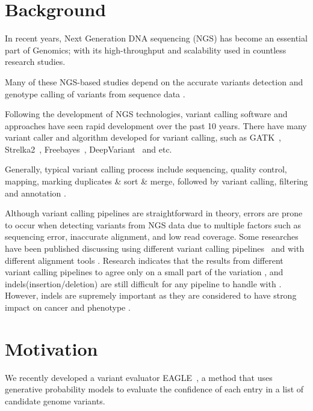 \hspace{24pt}

\section{Background}
In recent years, Next Generation DNA sequencing (NGS) has become an essential part of Genomics; with its high-throughput and scalability used in countless research studies.

Many of these NGS-based studies depend on the accurate variants detection and genotype calling of variants from sequence data \cite{nielsen2011genotype}.

Following the development of NGS technologies, variant calling software and approaches have seen rapid development over the past 10 years. There have many variant caller and algorithm developed for variant calling, such as GATK~\cite{poplin2018scaling}, Strelka2~\cite{saunders2012strelka}, Freebayes~\cite{garrison2012haplotype}, DeepVariant~\cite{poplin2018universal} and etc.

Generally, typical variant calling process include sequencing, quality control, mapping, marking duplicates \& sort \& merge, followed by variant calling, filtering and annotation \cite{koboldt2020best}.

Although variant calling pipelines are straightforward in theory, errors are prone to occur when detecting variants from NGS data due to multiple factors such as sequencing error, inaccurate alignment, and low read coverage. Some researches have been published discussing using different variant calling pipelines~\cite{bian2018comparing,chen2019systematic} and with different alignment tools \cite{hwang2015systematic,zhao2020accuracy}. Research indicates that the results from different variant calling pipelines to agree only on a small part of the variation \cite{tian2015computational}, and
indels(insertion/deletion) are still difficult for any pipeline to handle with \cite{cornish2015comparison}. However, indels are supremely important as they are considered to have strong impact on cancer\cite{sehn2015insertions} and phenotype \cite{montgomery2013origin}.

\section{Motivation}	
We recently developed a variant evaluator EAGLE~\cite{kuo2018eagle}, a method that uses generative probability models to evaluate the confidence of each entry in a list of candidate genome variants.

